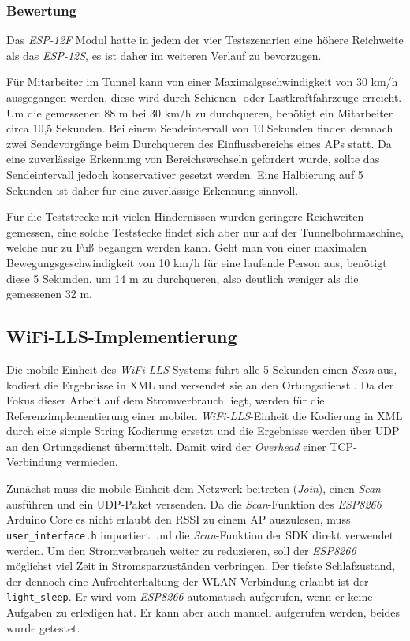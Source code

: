 \subsubsection{Bewertung}
\label{ch:Reichweite:sec:bewertung}
Das \emph{ESP-12F} Modul hatte in jedem der vier Testszenarien eine höhere Reichweite als das \emph{ESP-12S}, es ist daher im weiteren Verlauf zu bevorzugen.

Für Mitarbeiter im Tunnel kann von einer Maximalgeschwindigkeit von 30 km/h ausgegangen werden, diese wird durch Schienen- oder Lastkraftfahrzeuge erreicht. 
Um die gemessenen 88 m bei 30 km/h zu durchqueren, benötigt ein Mitarbeiter circa 10,5 Sekunden. 
Bei einem Sendeintervall von 10 Sekunden finden demnach zwei Sendevorgänge beim Durchqueren des Einflussbereichs eines APs statt.
Da eine zuverlässige Erkennung von Bereichswechseln gefordert wurde, sollte das Sendeintervall jedoch konservativer gesetzt werden. 
Eine Halbierung auf 5 Sekunden ist daher für eine zuverlässige Erkennung sinnvoll.

Für die Teststrecke mit vielen Hindernissen wurden geringere Reichweiten gemessen, eine solche Teststecke findet sich aber nur auf der Tunnelbohrmaschine, welche nur zu Fuß begangen werden kann. 
Geht man von einer maximalen Bewegungsgeschwindigkeit von 10 km/h für eine laufende Person aus, benötigt diese 5 Sekunden, um 14 m zu durchqueren, also deutlich weniger als die gemessenen 32 m.





\subsection{WiFi-LLS-Implementierung}
\label{ch:phase1:sec:wifills}
Die mobile Einheit des \emph{WiFi-LLS} Systems führt alle 5 Sekunden einen \emph{Scan} aus, kodiert die Ergebnisse in XML und versendet sie an den Ortungsdienst \cite{chen2007design}.
Da der Fokus dieser Arbeit auf dem Stromverbrauch liegt, werden für die Referenzimplementierung einer mobilen \emph{WiFi-LLS}-Einheit die Kodierung in XML durch eine simple String Kodierung ersetzt und die Ergebnisse werden über UDP an den Ortungsdienst übermittelt. 
Damit wird der \emph{Overhead} einer TCP-Verbindung vermieden.

Zunächst muss die mobile Einheit dem Netzwerk beitreten (\emph{Join}), einen \emph{Scan} ausführen und ein UDP-Paket versenden.
Da die \emph{Scan}-Funktion des \emph{ESP8266} Arduino Core es nicht erlaubt den RSSI zu einem AP auszulesen, muss \texttt{user\_interface.h} importiert und die \emph{Scan}-Funktion der SDK direkt verwendet werden.
Um den Stromverbrauch weiter zu reduzieren, soll der \emph{ESP8266} möglichst viel Zeit in Stromsparzuständen verbringen.
Der tiefste Schlafzustand, der dennoch eine Aufrechterhaltung der WLAN-Verbindung erlaubt ist der \texttt{light\_sleep}. 
Er wird vom \emph{ESP8266} automatisch aufgerufen, wenn er keine Aufgaben zu erledigen hat.
Er kann aber auch manuell aufgerufen werden, beides wurde getestet.

